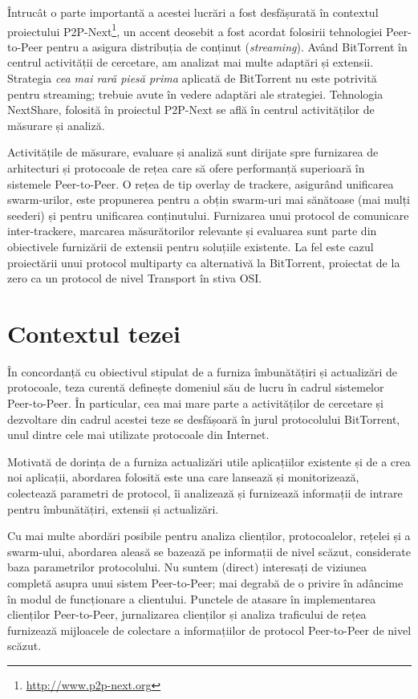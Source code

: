 Întrucât o parte importantă a acestei lucrări a fost desfășurată în contextul
proiectului P2P-Next\footnote{\url{http://www.p2p-next.org}}, un accent
deosebit a fost acordat folosirii tehnologiei Peer-to-Peer pentru a asigura
distribuția de conținut (\textit{streaming}). Având BitTorrent în centrul
activității de cercetare, am analizat mai multe adaptări și extensii.
Strategia \textit{cea mai rară piesă prima} aplicată de BitTorrent nu este
potrivită pentru streaming; trebuie avute în vedere adaptări ale strategiei.
Tehnologia NextShare, folosită în proiectul P2P-Next se află în centrul
activităților de măsurare și analiză.

Activitățile de măsurare, evaluare și analiză sunt dirijate spre furnizarea de
arhitecturi și protocoale de rețea care să ofere performanță superioară în
sistemele Peer-to-Peer. O rețea de tip overlay de trackere, asigurând
unificarea swarm-urilor, este propunerea pentru a obțin swarm-uri mai
sănătoase (mai mulți seederi) și pentru unificarea conținutului. Furnizarea
unui protocol de comunicare inter-trackere, marcarea măsurătorilor relevante
și evaluarea sunt parte din obiectivele furnizării de extensii pentru
soluțiile existente. La fel este cazul proiectării unui protocol multiparty ca
alternativă la BitTorrent, proiectat de la zero ca un protocol de nivel
Transport în stiva OSI.

\section{Contextul tezei}
\label{sec:intro:scope}

În concordanță cu obiectivul stipulat de a furniza îmbunătățiri și actualizări
de protocoale, teza curentă definește domeniul său de lucru în
cadrul sistemelor Peer-to-Peer. În particular, cea mai mare parte a
activităților de cercetare și dezvoltare din cadrul acestei teze se desfășoară
în jurul protocolului BitTorrent, unul dintre cele mai utilizate protocoale
din Internet.

Motivată de dorința de a furniza actualizări utile aplicațiilor existente și
de a crea noi aplicații, abordarea folosită este una care lansează și
monitorizează, colectează parametri de protocol, îi analizează și furnizează
informații de intrare pentru îmbunătățiri, extensii și actualizări.

Cu mai multe abordări posibile pentru analiza clienților, protocoalelor,
rețelei și a swarm-ului, abordarea aleasă se bazează pe informații de nivel
scăzut, considerate baza parametrilor protocolului. Nu suntem (direct)
interesați de viziunea completă asupra unui sistem Peer-to-Peer; mai degrabă
de o privire în adâncime în modul de funcționare a clientului. Punctele de
atasare în implementarea clienților Peer-to-Peer, jurnalizarea clienților și
analiza traficului de rețea furnizează mijloacele de colectare a informațiilor
de protocol Peer-to-Peer de nivel scăzut.

